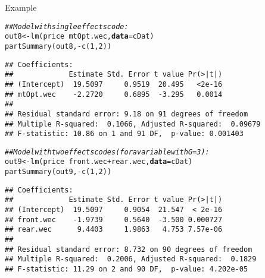 \documentclass{beamer}\usepackage[]{graphicx}\usepackage[]{color}
\makeatletter
\newcommand{\hlnum}[1]{\textcolor[rgb]{0.69,0.494,0}{#1}}%
\newcommand{\hlcom}[1]{\textcolor[rgb]{0.514,0.506,0.514}{\textit{#1}}}%
\newcommand{\hlopt}[1]{\textcolor[rgb]{0,0,0}{#1}}%
\newcommand{\hlstd}[1]{\textcolor[rgb]{0,0,0}{#1}}%
\newcommand{\hlkwb}[1]{\textcolor[rgb]{0,0.341,0.682}{#1}}%
\newcommand{\hlkwc}[1]{\textcolor[rgb]{0,0,0}{\textbf{#1}}}%
\newcommand{\hlkwd}[1]{\textcolor[rgb]{0.004,0.004,0.506}{#1}}%
\newenvironment{kframe}{%
 \def\at@end@of@kframe{}%
 \ifinner\ifhmode%
  \def\at@end@of@kframe{\end{minipage}}%
  \begin{minipage}{\columnwidth}%
 \fi\fi%
 \def\FrameCommand##1{\hskip\@totalleftmargin \hskip-\fboxsep
 \colorbox{shadecolor}{##1}\hskip-\fboxsep
     \hskip-\linewidth \hskip-\@totalleftmargin \hskip\columnwidth}%
 \MakeFramed {\advance\hsize-\width
   \@totalleftmargin\z@ \linewidth\hsize
   \@setminipage}}%
 {\par\unskip\endMakeFramed%
 \at@end@of@kframe}
\newenvironment{knitrout}{}{} %
\makeatother
\begin{document}
\begin{frame}{Example}
  
\begin{knitrout}\footnotesize
{}\color{fgcolor}\begin{kframe}
\begin{alltt}
\hlcom{## Model with single effects code:}
\hlstd{out8} \hlkwb{<-} \hlkwd{lm}\hlstd{(price} \hlopt{~} \hlstd{mtOpt.wec,} \hlkwc{data} \hlstd{= cDat)}
\hlkwd{partSummary}\hlstd{(out8,} \hlopt{-}\hlkwd{c}\hlstd{(}\hlnum{1}\hlstd{,} \hlnum{2}\hlstd{))}
\end{alltt}
\begin{verbatim}
## Coefficients:
##             Estimate Std. Error t value Pr(>|t|)
## (Intercept)  19.5097     0.9519  20.495   <2e-16
## mtOpt.wec    -2.2720     0.6895  -3.295   0.0014
## 
## Residual standard error: 9.18 on 91 degrees of freedom
## Multiple R-squared:  0.1066,	Adjusted R-squared:  0.09679 
## F-statistic: 10.86 on 1 and 91 DF,  p-value: 0.001403
\end{verbatim}
\end{kframe}
\end{knitrout}

\pagebreak

\begin{knitrout}\footnotesize
{}\color{fgcolor}\begin{kframe}
\begin{alltt}
\hlcom{## Model with two effects codes (for a variable with G = 3):}
\hlstd{out9} \hlkwb{<-} \hlkwd{lm}\hlstd{(price} \hlopt{~} \hlstd{front.wec} \hlopt{+} \hlstd{rear.wec,} \hlkwc{data} \hlstd{= cDat)}
\hlkwd{partSummary}\hlstd{(out9,} \hlopt{-}\hlkwd{c}\hlstd{(}\hlnum{1}\hlstd{,} \hlnum{2}\hlstd{))}
\end{alltt}
\begin{verbatim}
## Coefficients:
##             Estimate Std. Error t value Pr(>|t|)
## (Intercept)  19.5097     0.9054  21.547  < 2e-16
## front.wec    -1.9739     0.5640  -3.500 0.000727
## rear.wec      9.4403     1.9863   4.753 7.57e-06
## 
## Residual standard error: 8.732 on 90 degrees of freedom
## Multiple R-squared:  0.2006,	Adjusted R-squared:  0.1829 
## F-statistic: 11.29 on 2 and 90 DF,  p-value: 4.202e-05
\end{verbatim}
\end{kframe}
\end{knitrout}

\end{frame}
\end{document}
